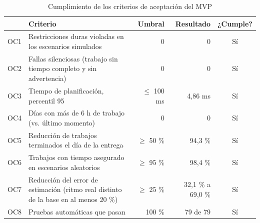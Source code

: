 \begin{table}[H]
\centering\small
\caption{Cumplimiento de los criterios de aceptación del MVP}\label{tab:objetivos}
\begin{tabularx}{\textwidth}{l >{\raggedright\arraybackslash}X r r c}
\toprule
 & Criterio & Umbral & Resultado & ¿Cumple? \\
\midrule
OC1 & Restricciones duras violadas en los escenarios simulados & 0 & 0 & Sí \\
OC2 & Fallas silenciosas (trabajo sin tiempo completo y sin advertencia) & 0 & 0 & Sí \\
OC3 & Tiempo de planificación, percentil 95 & $\leq$ 100 ms & 4,86 ms & Sí \\
OC4 & Días con más de 6 h de trabajo (vs. último momento) & 0 & 0 & Sí \\
OC5 & Reducción de trabajos terminados el día de la entrega & $\geq$ 50 \% & 94,3 \% & Sí \\
OC6 & Trabajos con tiempo asegurado en escenarios aleatorios & $\geq$ 95 \% & 98,4 \% & Sí \\
OC7 & Reducción del error de estimación (ritmo real distinto de la base en al menos 20 \%) & $\geq$ 25 \% & 32,1 \% a 69,0 \% & Sí \\
OC8 & Pruebas automáticas que pasan & 100 \% & 79 de 79 & Sí \\
\bottomrule
\end{tabularx}
\end{table}
